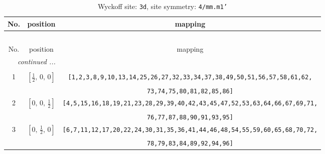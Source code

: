 \documentclass[fleqn,8pt]{jsarticle}
\begin{document}
\begin{longtable}{ccc}
\caption{Wyckoff site: {\tt 3d}, site symmetry: {\tt 4/mm.m1'}}
 \\
 \hline \hline
No. & position & mapping \\ \hline \endfirsthead

\multicolumn{2}{l}{\tablename\ \thetable{}} \\
 \hline \hline
No. & position & mapping \\ \hline \endhead

 \hline \hline
\multicolumn{2}{r}{\footnotesize\it continued ...} \\ \endfoot

 \hline \hline
\multicolumn{2}{r}{} \\ \endlastfoot

1 & $\left[ \frac{1}{2},\, 0,\, 0 \right]$ & {\tt [1,2,3,8,9,10,13,14,25,26,27,32,33,34,37,38,49,50,51,56,57,58,61,62,} \\ \hline
 &  & {\tt 73,74,75,80,81,82,85,86]} \\ \hline
2 & $\left[ 0,\, 0,\, \frac{1}{2} \right]$ & {\tt [4,5,15,16,18,19,21,23,28,29,39,40,42,43,45,47,52,53,63,64,66,67,69,71,} \\ \hline
 &  & {\tt 76,77,87,88,90,91,93,95]} \\ \hline
3 & $\left[ 0,\, \frac{1}{2},\, 0 \right]$ & {\tt [6,7,11,12,17,20,22,24,30,31,35,36,41,44,46,48,54,55,59,60,65,68,70,72,} \\ \hline
 &  & {\tt 78,79,83,84,89,92,94,96]} \\
\end{longtable}
\renewcommand{\arraystretch}{1.2}
\end{document}

